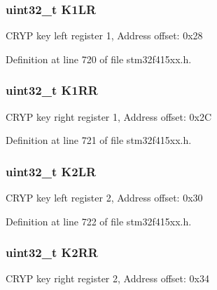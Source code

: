 \subsubsection[{\texorpdfstring{K1\+LR}{K1LR}}]{ uint32\+\_\+t K1\+LR}\hypertarget{struct_c_r_y_p___type_def_a948ff2e2e97978287411fe725dd70a7f}{}\label{struct_c_r_y_p___type_def_a948ff2e2e97978287411fe725dd70a7f}
C\+R\+YP key left register 1, Address offset\+: 0x28 

Definition at line 720 of file stm32f415xx.\+h.

\subsubsection[{\texorpdfstring{K1\+RR}{K1RR}}]{ uint32\+\_\+t K1\+RR}\hypertarget{struct_c_r_y_p___type_def_a7554383cff84540eb260a3fdf55cb934}{}\label{struct_c_r_y_p___type_def_a7554383cff84540eb260a3fdf55cb934}
C\+R\+YP key right register 1, Address offset\+: 0x2C 

Definition at line 721 of file stm32f415xx.\+h.

\subsubsection[{\texorpdfstring{K2\+LR}{K2LR}}]{ uint32\+\_\+t K2\+LR}\hypertarget{struct_c_r_y_p___type_def_a32210fb9ecbb0b4bd127e688f3f79802}{}\label{struct_c_r_y_p___type_def_a32210fb9ecbb0b4bd127e688f3f79802}
C\+R\+YP key left register 2, Address offset\+: 0x30 

Definition at line 722 of file stm32f415xx.\+h.

\subsubsection[{\texorpdfstring{K2\+RR}{K2RR}}]{ uint32\+\_\+t K2\+RR}\hypertarget{struct_c_r_y_p___type_def_a41a0448734e8ccbdd6fba98284815c6f}{}\label{struct_c_r_y_p___type_def_a41a0448734e8ccbdd6fba98284815c6f}
C\+R\+YP key right register 2, Address offset\+: 0x34 

